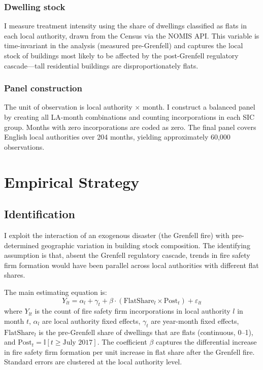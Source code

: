 \documentclass[12pt]{article}
\newcommand{\ind}{\mathbb{I}}
\begin{document}
\subsubsection*{Dwelling stock} I measure treatment intensity using the share of dwellings classified as flats in each local authority, drawn from the Census via the NOMIS API. This variable is time-invariant in the analysis (measured pre-Grenfell) and captures the local stock of buildings most likely to be affected by the post-Grenfell regulatory cascade---tall residential buildings are disproportionately flats.

\subsubsection*{Panel construction} The unit of observation is local authority $\times$ month. I construct a balanced panel by creating all LA-month combinations and counting incorporations in each SIC group. Months with zero incorporations are coded as zero. The final panel covers English local authorities over 204 months, yielding approximately 60,000 observations.




\section{Empirical Strategy}

\subsection{Identification}

I exploit the interaction of an exogenous disaster (the Grenfell fire) with pre-determined geographic variation in building stock composition. The identifying assumption is that, absent the Grenfell regulatory cascade, trends in fire safety firm formation would have been parallel across local authorities with different flat shares.

The main estimating equation is:
\begin{equation}
Y_{lt} = \alpha_l + \gamma_t + \beta \cdot (\text{FlatShare}_l \times \text{Post}_t) + \varepsilon_{lt}
\label{eq:main}
\end{equation}
where $Y_{lt}$ is the count of fire safety firm incorporations in local authority $l$ in month $t$, $\alpha_l$ are local authority fixed effects, $\gamma_t$ are year-month fixed effects, $\text{FlatShare}_l$ is the pre-Grenfell share of dwellings that are flats (continuous, 0--1), and $\text{Post}_t = \ind[t \geq \text{July 2017}]$. The coefficient $\beta$ captures the differential increase in fire safety firm formation per unit increase in flat share after the Grenfell fire. Standard errors are clustered at the local authority level.
\end{document}
